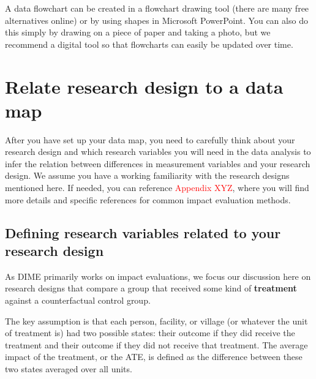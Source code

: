 A data flowchart can be created in a flowchart drawing tool
(there are many free alternatives online) or
by using shapes in Microsoft PowerPoint.
You can also do this simply by drawing on a piece of paper and taking a photo,
but we recommend a digital tool
so that flowcharts can easily be updated over time.

\section{Relate research design to a data map}

After you have set up your data map,
you need to carefully think about your research design
and which research variables you will need in the data analysis
to infer the relation between differences in measurement variables
and your research design.
We assume you have a working familiarity
with the research designs mentioned here.
If needed, you can reference \textcolor{red}{Appendix XYZ},
where you will find more details
and specific references for common impact evaluation methods.

\subsection{Defining research variables related to your research design}

As DIME primarily works on impact evaluations,
we focus our discussion here on research designs
that compare a group that received
some kind of \textbf{treatment}
against a counterfactual control group.

The key assumption is that each
person, facility, or village
(or whatever the unit of treatment is)
had two possible states: their outcome if they did receive the treatment
and their outcome if they did not receive that treatment.
The average impact of the treatment, or the ATE,
is defined as the difference
between these two states averaged over all units.

